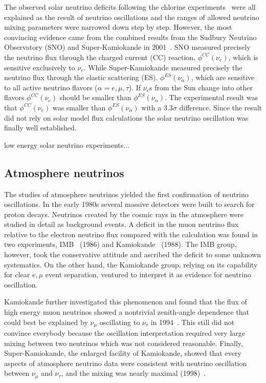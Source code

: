 The observed solar neutrino deficits following the chlorine experiments~\cite{Hir89,Aba91,Ans92} were all explained as the result of neutrino oscillations and the ranges of allowed neutrino mixing parameters were narrowed down step by step. However, the most convincing evidence came from the combined results from the Sudbury Neutrino Observatory (SNO) and Super-Kamiokande in 2001~\cite{Ahm01,Fuk01}. SNO measured precisely the neutrino flux through the charged current (CC) reaction, $\phi^{CC}(\nu_e)$, which is sensitive exclusively to $\nu_e$. While Super-Kamiokande measured precisely the neutrino flux through the elastic scattering (ES), $\phi^{ES}(\nu_\alpha)$, which are sensitive to all active neutrino flavors ($\alpha = e, \mu, \tau$).  If $\nu_e$s from the Sun change into other flavors $\phi^{CC}(\nu_e)$ should be smaller than $\phi^{ES}(\nu_\alpha)$. The experimental result was that $\phi^{CC}(\nu_e)$ was smaller than $\phi^{ES}(\nu_\alpha)$ with a $3.3\sigma$ difference. Since the result did not rely on solar model flux calculations the solar neutrino oscillation was finally well established.

low energy solar neutrino experiments...

\subsection{Atmosphere neutrinos}
\label{sec:atmo}
The studies of atmosphere neutrinos yielded the first confirmation of neutrino oscillations. In the early 1980s several massive detectors were built to search for proton decays. Neutrinos created by the cosmic rays in the atmosphere were studied in detail as background events. A deficit in the muon neutrino flux relative to the electron neutrino flux compared with the calculation was found in two experiments, IMB~\cite{Hai86} (1986) and Kamiokande~\cite{Hir88} (1988). The IMB group, however, took the conservative attitude and ascribed the deficit to some unknown systematics. On the other hand, the Kamiokande group, relying on its capability for clear $e, \mu$ event separation, ventured to interpret it as evidence for neutrino oscillation.

Kamiokande further investigated this phenomenon and found that the flux of high energy muon neutrinos showed a nontrivial zenith-angle dependence that could best be explained by $\nu_\mu$ oscillating to $\nu_\tau$ in 1994~\cite{Fuk94}. This still did not convince everybody because the oscillation interpretation required very large mixing between two neutrinos which was not considered reasonable. Finally, Super-Kamiokande, the enlarged facility of Kamiokande, showed that every aspects of atmosphere neutrino data were consistent with neutrino oscillation between $\nu_\mu$ and $\nu_\tau$, and the mixing was nearly maximal (1998)~\cite{Fuk98}.

